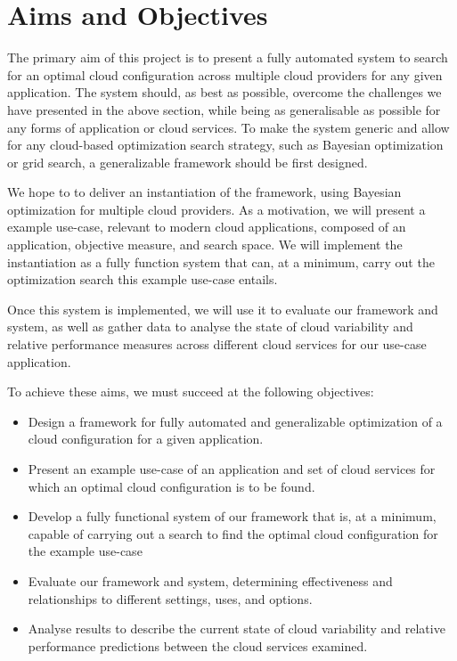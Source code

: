 \documentclass{report}
\begin{document}
\section{Aims and Objectives}
The primary aim of this project is to present a fully automated system to search for an optimal cloud configuration across multiple cloud providers for any given application. The system should, as best as possible, overcome the challenges we have presented in the above section, while being as generalisable as possible for any forms of application or cloud services. To make the system generic and allow for any cloud-based optimization search strategy, such as Bayesian optimization or grid search, a generalizable framework should be first designed.

We hope to to deliver an instantiation of the framework, using Bayesian optimization for multiple cloud providers. As a motivation, we will present a example use-case, relevant to modern cloud applications, composed of an application, objective measure, and search space. We will implement the instantiation as a fully function system that can, at a minimum, carry out the optimization search this example use-case entails.

Once this system is implemented, we will use it to evaluate our framework and system, as well as gather data to analyse the state of cloud variability and relative performance measures across different cloud services for our use-case application.  

To achieve these aims, we must succeed at the following objectives:
\begin{itemize}
\item Design a framework for fully automated and generalizable optimization of a cloud configuration for a given application.
\item Present an example use-case of an application and set of cloud services for which an optimal cloud configuration is to be found.
\item Develop a fully functional system of our framework that is, at a minimum, capable of carrying out a search to find the optimal cloud configuration for the example use-case
\item Evaluate our framework and system, determining effectiveness and relationships to different settings, uses, and options.
\item Analyse results to describe the current state of cloud variability and relative performance predictions between the cloud services examined.
\end{itemize}
\end{document}
